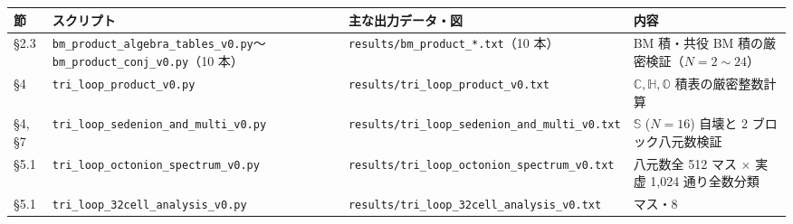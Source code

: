 \documentclass[
  a4paper,
]{ltjsarticle}
\newcounter{none} %
\begin{document}
{\def\LTcaptype{none} %
\begin{longtable}[]{@{}
  >{\raggedright\arraybackslash}p{}
  >{\raggedright\arraybackslash}p{}
  >{\raggedright\arraybackslash}p{}
  >{\raggedright\arraybackslash}p{}@{}}
\toprule\noalign{}
\begin{minipage}[b]{\linewidth}\raggedright
節
\end{minipage} & \begin{minipage}[b]{\linewidth}\raggedright
スクリプト
\end{minipage} & \begin{minipage}[b]{\linewidth}\raggedright
主な出力データ・図
\end{minipage} & \begin{minipage}[b]{\linewidth}\raggedright
内容
\end{minipage} \\
\midrule\noalign{}
\endhead
\bottomrule\noalign{}
\endlastfoot
§2.3 &
\texttt{bm\_\allowbreak{}product\_\allowbreak{}algebra\_\allowbreak{}tables\_\allowbreak{}v0.py}〜\texttt{bm\_\allowbreak{}product\_\allowbreak{}conj\_\allowbreak{}v0.py}（10
本） & \texttt{results/\allowbreak{}bm\_\allowbreak{}product\_\allowbreak{}*.txt}（10 本） & BM 積・共役 BM
積の厳密検証（\(N=2 \sim 24\)） \\
§4 & \texttt{tri\_\allowbreak{}loop\_\allowbreak{}product\_\allowbreak{}v0.py} &
\texttt{results/\allowbreak{}tri\_\allowbreak{}loop\_\allowbreak{}product\_\allowbreak{}v0.txt} &
\(\mathbb{C}, \mathbb{H}, \mathbb{O}\) 積表の厳密整数計算 \\
§4, §7 & \texttt{tri\_\allowbreak{}loop\_\allowbreak{}sedenion\_\allowbreak{}and\_\allowbreak{}multi\_\allowbreak{}v0.py} &
\texttt{results/\allowbreak{}tri\_\allowbreak{}loop\_\allowbreak{}sedenion\_\allowbreak{}and\_\allowbreak{}multi\_\allowbreak{}v0.txt} &
\(\mathbb{S}\) (\(N=16\)) 自壊と 2 ブロック八元数検証 \\
§5.1 & \texttt{tri\_\allowbreak{}loop\_\allowbreak{}octonion\_\allowbreak{}spectrum\_\allowbreak{}v0.py} &
\texttt{results/\allowbreak{}tri\_\allowbreak{}loop\_\allowbreak{}octonion\_\allowbreak{}spectrum\_\allowbreak{}v0.txt} & 八元数全 512
マス × 実虚 1,024 通り全数分類 \\
§5.1 & \texttt{tri\_\allowbreak{}loop\_\allowbreak{}32cell\_\allowbreak{}analysis\_\allowbreak{}v0.py} &
\texttt{results/\allowbreak{}tri\_\allowbreak{}loop\_\allowbreak{}32cell\_\allowbreak{}analysis\_\allowbreak{}v0.txt} & 32 マス・8

\end{longtable}}
\end{document}
